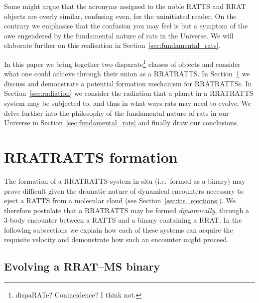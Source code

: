\documentclass[twocolumn, twocolappendix]{aastex631}
\newcommand{\tauriRAT}{RATTS\xspace}
\newcommand{\radioRAT}{RRAT\xspace}
\newcommand{\binaryRAT}{RRATRATTS\xspace}
\begin{document}
Some might argue that the acronyms assigned to the noble \tauriRAT and \radioRAT objects are overly similar, confusing even, for the uninitiated reader. On the contrary we emphasise that the confusion you may feel is but a symptom of the awe engendered by the fundamental nature of rats in the Universe. We will elaborate further on this realisation in Section~\ref{sec:fundamental_rats}.

In this paper we bring together two disparate\footnote{dispaRATe? Conincidence? I think not.} classes of objects and consider what one could achieve through their union as a \binaryRAT. In Section~\ref{sec:rat_formation} we discuss and demonstrate a potential formation mechanism for \binaryRAT{}s. In Section~\ref{sec:radiation} we consider the radiation that a planet in a \binaryRAT system may be subjected to, and thus in what ways rats may need to evolve. We delve further into the philosophy of the fundamental nature of rats in our Universe in Section~\ref{sec:fundamental_rats} and finally draw our conclusions.

\section{\binaryRAT{} formation}\label{sec:rat_formation}

The formation of a \binaryRAT system in-situ (i.e.\ formed as a binary) may prove difficult given the dramatic nature of dynamical encounters necessary to eject a \tauriRAT from a molecular cloud (see Section~\ref{sec:tts_ejections}). We therefore postulate that a \binaryRAT may be formed \textit{dynamically}, through a 3-body encounter between a \tauriRAT and a binary containing a \radioRAT. In the following subsections we explain how each of these systems can acquire the requisite velocity and demonstrate how such an encounter might proceed.

\subsection{Evolving a \radioRAT--MS binary}
\end{document}
